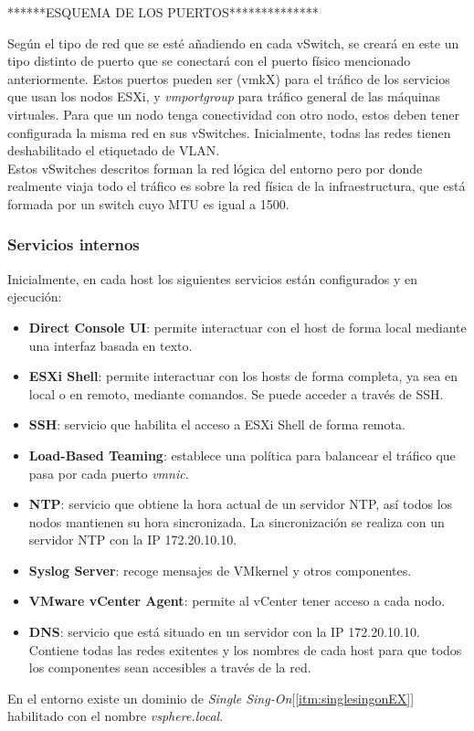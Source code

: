 ******ESQUEMA DE LOS PUERTOS**************

 Según el tipo de red que se esté añadiendo en cada vSwitch, se creará en este un tipo distinto de puerto que se conectará con el puerto físico mencionado anteriormente. Estos puertos pueden ser  (vmkX) para el tráfico de los servicios que usan los nodos ESXi, y \textit{vmportgroup} para tráfico general de las máquinas virtuales.
 Para que un nodo tenga conectividad con otro nodo, estos deben tener configurada la misma red en sus vSwitches. 
 Inicialmente, todas las redes tienen deshabilitado el etiquetado de VLAN.\\
 Estos vSwitches descritos forman la red lógica del entorno pero por donde realmente viaja todo el tráfico es sobre la red física de la infraestructura, que está formada por un switch cuyo MTU es igual a 1500.
 
 
 \subsubsection{Servicios internos}
 
 Inicialmente, en cada host los siguientes servicios están configurados y en ejecución:
 \begin{itemize}
     \item \textbf{Direct Console UI}: permite interactuar con el host de forma local mediante una interfaz basada en texto.
     \item \textbf{ESXi Shell}: permite interactuar con los hosts de forma completa, ya sea en local o en remoto, mediante comandos. Se puede acceder a través de SSH.
     \item \textbf{SSH}: servicio que habilita el acceso a ESXi Shell de forma remota.
     \item \textbf{Load-Based Teaming}: establece una política para balancear el tráfico que pasa por cada puerto \emph{vmnic}.
     \item \textbf{NTP}: servicio que obtiene la hora actual de un servidor NTP, así todos los nodos mantienen su hora sincronizada. La sincronización se realiza con un servidor NTP con la IP 172.20.10.10.
     \item \textbf{Syslog Server}: recoge mensajes de VMkernel y otros componentes.
     \item \textbf{VMware vCenter Agent}: permite al vCenter tener acceso a cada nodo.
     \item \textbf{DNS}: servicio que está situado en un servidor con la IP 172.20.10.10. Contiene todas las redes exitentes y los nombres de cada host para que todos los componentes sean accesibles a través de la red.
 \end{itemize}
 En el entorno existe un dominio de \emph{Single Sing-On}[\ref{itm:singlesingonEX}] habilitado con el nombre \emph{vsphere.local}.\\
 
